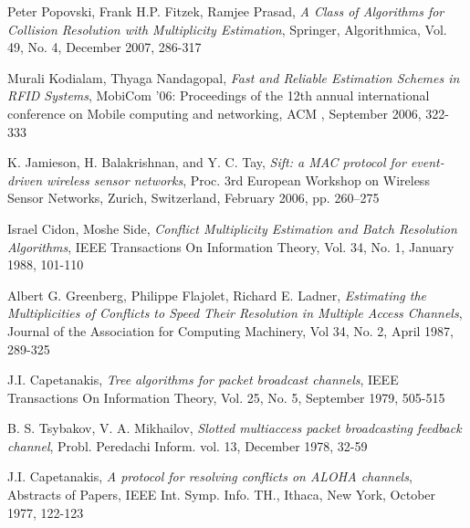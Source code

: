 \begin{thebibliography}{99}
 
  Peter Popovski, Frank H.P. Fitzek, Ramjee Prasad, \emph{ A Class of Algorithms for Collision Resolution with Multiplicity Estimation}, Springer, Algorithmica, Vol. 49, No. 4, December 2007, 286-317
  
Murali Kodialam, Thyaga Nandagopal, \emph{Fast and Reliable Estimation Schemes in RFID Systems}, MobiCom '06: Proceedings of the 12th annual international conference on Mobile computing and networking, ACM , September 2006, 322-333 
 
K. Jamieson, H. Balakrishnan, and Y. C. Tay, \emph{Sift: a MAC protocol for event-driven wireless sensor networks},  Proc. 3rd European Workshop on Wireless Sensor Networks, Zurich, Switzerland, February 2006, pp. 260–275 

 Israel Cidon, Moshe Side, \emph{Conflict Multiplicity Estimation and Batch Resolution Algorithms}, IEEE Transactions On Information Theory, Vol. 34, No. 1, January 1988, 101-110
 
  Albert G. Greenberg, Philippe Flajolet,  Richard E. Ladner,
  \emph{Estimating the Multiplicities of Conflicts to Speed Their Resolution in Multiple Access Channels},
  Journal of the Association for Computing Machinery,
  Vol 34, No. 2, April 1987, 289-325
 
  J.I. Capetanakis, \emph{ Tree algorithms for packet broadcast channels}, IEEE Transactions On Information Theory, Vol. 25, No. 5, September 1979, 505-515
 
B. S. Tsybakov, V. A. Mikhailov, \emph{Slotted multiaccess packet broadcasting feedback channel}, Probl. Peredachi Inform. vol. 13, December 1978, 32-59
 
J.I. Capetanakis, \emph{A protocol for resolving conflicts on ALOHA channels}, Abstracts of Papers, IEEE Int. Symp. Info. TH., Ithaca, New York, October 1977, 122-123

 \end{thebibliography}
 
